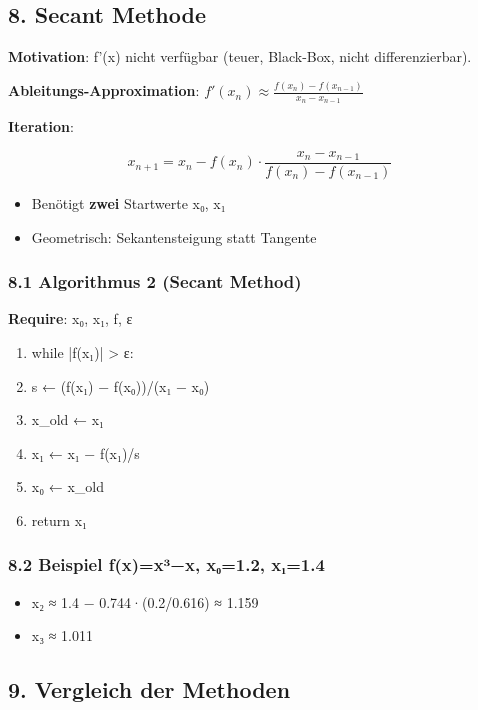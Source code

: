 \documentclass[11pt, a4paper]{article}
\begin{document}
\subsection{8. Secant Methode}

\textbf{Motivation}: f'(x) nicht verfügbar (teuer, Black-Box, nicht differenzierbar).


\textbf{Ableitungs-Approximation}: $f'(x_n) \approx \frac{f(x_n) - f(x_{n-1})}{x_n - x_{n-1}}$


\textbf{Iteration}:

\[
x_{n+1} = x_n - f(x_n) \cdot \frac{x_n - x_{n-1}}{f(x_n) - f(x_{n-1})}
\]


\begin{itemize}
  \item Benötigt \textbf{zwei} Startwerte x₀, x₁
  \item Geometrisch: Sekantensteigung statt Tangente
\end{itemize}


\subsubsection{8.1 Algorithmus 2 (Secant Method)}
\textbf{Require}: x₀, x₁, f, ε

\begin{enumerate}
  \item while |f(x₁)| > ε:
  \item s ← (f(x₁) − f(x₀))/(x₁ − x₀)
  \item x\_old ← x₁
  \item x₁ ← x₁ − f(x₁)/s
  \item x₀ ← x\_old
  \item return x₁
\end{enumerate}


\subsubsection{8.2 Beispiel f(x)=x³−x, x₀=1.2, x₁=1.4}
\begin{itemize}
  \item x₂ ≈ 1.4 − 0.744·(0.2/0.616) ≈ 1.159
  \item x₃ ≈ 1.011
\end{itemize}


\subsection{9. Vergleich der Methoden}
\end{document}

